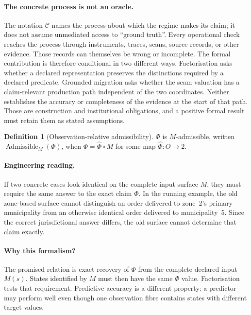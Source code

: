 \documentclass[11pt]{article}
\theoremstyle{definition}
\newtheorem{definition}{Definition}[section]
\begin{document}
\paragraph{The concrete process is not an oracle.} The notation $\mathcal{C}$ names the process about which the regime makes its claim; it does not assume unmediated access to ``ground truth''. Every operational check reaches the process through instruments, traces, scans, source records, or other evidence. Those records can themselves be wrong or incomplete. The formal contribution is therefore conditional in two different ways. Factorisation asks whether a declared representation preserves the distinctions required by a declared predicate. Grounded migration asks whether the seam valuation has a claim-relevant production path independent of the two coordinates. Neither establishes the accuracy or completeness of the evidence at the start of that path. Those are construction and institutional obligations, and a positive formal result must retain them as stated assumptions.

\begin{definition}[Observation-relative admissibility]\label{ex:def:admissible}
$\Phi$ is $M$-admissible, written $\operatorname{Admissible}_M(\Phi)$, when $\Phi=\widehat\Phi \circ M$ for some map $\widehat\Phi:O\to 2$.
\end{definition}

\paragraph{Engineering reading.} If two concrete cases look identical on the complete input surface $M$, they must require the same answer to the exact claim $\Phi$. In the running example, the old zone-based surface cannot distinguish an order delivered to zone~2's primary municipality from an otherwise identical order delivered to municipality~5. Since the correct jurisdictional answer differs, the old surface cannot determine that claim exactly.

\paragraph{Why this formalism?} The promised relation is exact recovery of $\Phi$ from the complete declared input $M(s)$. States identified by $M$ must then have the same $\Phi$ value. Factorisation tests that requirement. Predictive accuracy is a different property: a predictor may perform well even though one observation fibre contains states with different target values.
\end{document}
